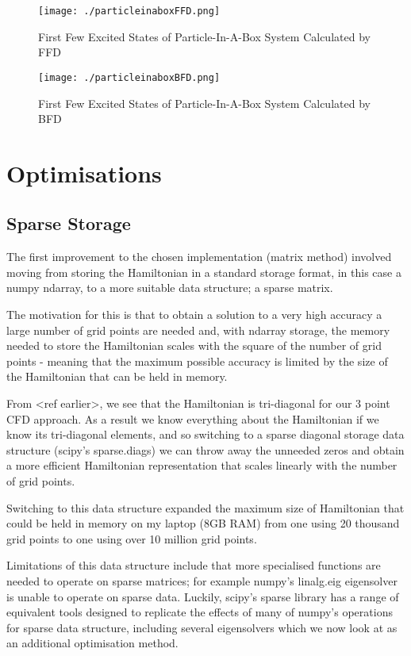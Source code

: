 \begin{figure}[H]
	\texttt{[image: ./particleinaboxFFD.png]}
	\centering
	\caption{First Few Excited States of Particle-In-A-Box System Calculated by FFD}
\end{figure}

\begin{figure}[H]
	\texttt{[image: ./particleinaboxBFD.png]}
	\centering
	\caption{First Few Excited States of Particle-In-A-Box System Calculated by BFD}
\end{figure}
\section{Optimisations}

\subsection{Sparse Storage}
The first improvement to the chosen implementation (matrix method) involved moving from storing the Hamiltonian in a standard storage format, in this case a numpy ndarray, to a more suitable data structure; a sparse matrix. 

The motivation for this is that to obtain a solution to a very high accuracy a large number of grid points are needed and, with ndarray storage, the memory needed to store the Hamiltonian scales with the square of the number of grid points - meaning that the maximum possible accuracy is limited by the size of the Hamiltonian that can be held in memory. 

From <ref earlier>, we see that the Hamiltonian is tri-diagonal for our 3 point CFD approach. As a result we know everything about the Hamiltonian if we know its tri-diagonal elements, and so switching to a sparse diagonal storage data structure (scipy's sparse.diags) we can throw away the unneeded zeros and obtain a more efficient Hamiltonian representation that scales linearly with the number of grid points. 

Switching to this data structure expanded the maximum size of Hamiltonian that could be held in memory on my laptop (8GB RAM) from one using 20 thousand grid points to one using over 10 million grid points.

Limitations of this data structure include that more specialised functions are needed to operate on sparse matrices; for example numpy's linalg.eig eigensolver is unable to operate on sparse data. Luckily, scipy's sparse library has a range of equivalent tools designed to replicate the effects of many of numpy's operations for sparse data structure, including several eigensolvers which we now look at as an additional optimisation method.

